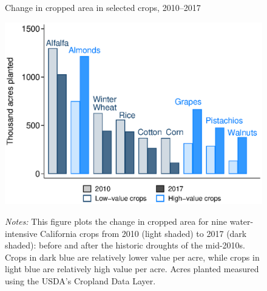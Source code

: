 \begin{figure}[h!]\centering
\captionsetup{width=\textwidth}
\caption{Change in cropped area in selected crops, 2010--2017}
\label{fig:acreage_bars2017}
\vspace{-2mm}
{\includegraphics[width=.8\textwidth]{figures/acreage_bars2017_blue.eps}}\\
\captionsetup{width=.85\textwidth}
\caption*{\scriptsize \emph{Notes:} This figure plots the change in cropped area for nine water-intensive California crops from 2010 (light shaded) to 2017 (dark shaded): before and after the historic droughts of the mid-2010s. Crops in dark blue are relatively lower value per acre, while crops in light blue are relatively high value per acre. Acres planted measured using the USDA's Cropland Data Layer.}
\end{figure}